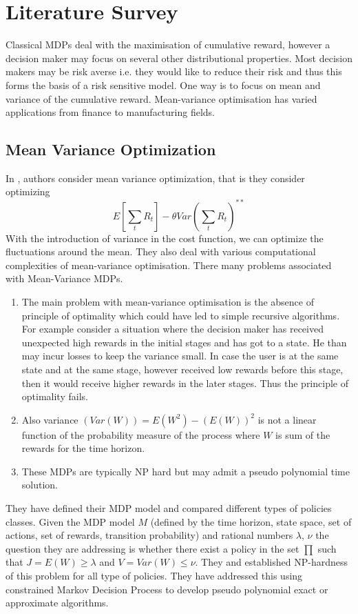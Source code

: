 \documentclass[11pt,a4paper,oneside]{report}
\begin{document}
\chapter{Literature Survey}


\noindent Classical MDPs deal with the maximisation of cumulative reward, however a decision maker may focus on several other distributional properties. Most decision makers may be risk averse i.e. they would like to reduce their risk and thus this forms the basis of a risk sensitive model. 
One way is to focus on mean and variance of the cumulative reward. Mean-variance optimisation has varied applications from finance to manufacturing fields.\\

\section{Mean Variance Optimization}
In \cite{mannor2011mean}, authors consider mean variance optimization, that is they consider optimizing 
\begin{equation}
E[\sum_t R_t] - \theta Var(\sum_t R_t) ^{**}
\end{equation}
With the introduction of variance in the cost function, we can optimize the fluctuations around the mean. They also deal with various computational complexities of mean-variance optimisation. There many problems associated with Mean-Variance MDPs.
\begin{enumerate}
\item The main problem with mean-variance optimisation is the absence of principle of optimality which could have led to simple recursive algorithms. For example consider a situation where the decision maker has received unexpected high rewards in the initial stages and has got to a state. He than may incur losses to keep the variance small. In case the user is at the same state and at the same stage, however received low rewards before this stage, then it would receive higher rewards in the later stages. Thus the principle of optimality fails. 
\item Also variance $ (Var(W))=E(W^2)- (E(W))^2$ is not a linear function of the probability measure of the process where $W$ is sum of the rewards for the time horizon.
\item These MDPs are typically NP hard but may admit a pseudo polynomial time solution.
\end{enumerate} 
They have defined their MDP model and compared different types of policies classes. Given the MDP model $M$ (defined by the time horizon, state space, set of actions, set of rewards, transition probability) and rational numbers $\lambda$, $\nu$ the question they are addressing is whether there exist a policy in the set  ${\prod}$ such that $J=E(W)\geq \lambda$ and $V=Var(W)\leq \nu$. They  and established NP-hardness of this problem for all type of policies. They have addressed this using constrained Markov Decision Process to develop pseudo polynomial exact or approximate algorithms.
\end{document}
